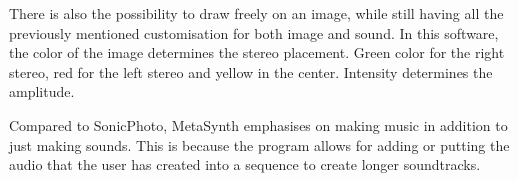 There is also the possibility to draw freely on an image, while still having all the previously mentioned customisation for both image and sound. In this software, the color of the image determines the stereo placement. Green color for the right stereo, red for the left stereo and yellow in the center. Intensity determines the amplitude. 

Compared to SonicPhoto, MetaSynth emphasises on making music in addition to just making sounds. This is because the program allows for adding or putting the audio that the user has created into a sequence to create longer soundtracks.